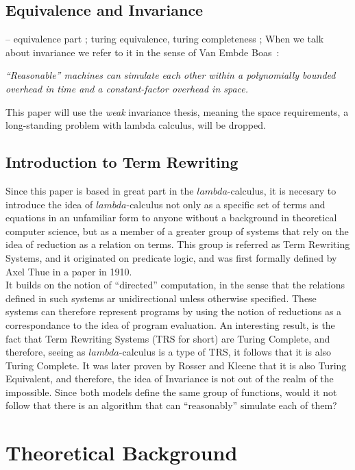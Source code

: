 \documentclass[12pt]{article}
\begin{document}
\subsection{Equivalence and Invariance}
-- equivalence part ; turing equivalence, turing completeness ;
When we talk about invariance we refer to it in the sense of Van Embde Boas~\cite{machine-models}: \\
\begin{center}
 \textit{\enquote{Reasonable} machines can simulate each other within a polynomially
bounded overhead in time and a constant-factor overhead in space.}
\end{center}

This paper will use the \textit{weak} invariance thesis, meaning the space requirements, a long-standing problem with lambda calculus, will be dropped.
\subsection{Introduction to Term Rewriting}
Since this paper is based in great part in the $lambda$-calculus, it is necesary to introduce the idea of $lambda$-calculus not only as a specific set of terms and equations in an unfamiliar form to anyone without a background in theoretical computer science, but as a member of a greater group of systems that rely on the idea of reduction as a relation on terms. This group is referred as Term Rewriting Systems, and it originated on predicate logic, and was first formally defined by Axel Thue in a paper in 1910.\\
It builds on the notion of \enquote{directed} computation, in the sense that the relations defined in such systems ar unidirectional unless otherwise specified. These systems can therefore represent programs by using the notion of reductions as a correspondance to the idea of program evaluation. An interesting result, is the fact that Term Rewriting Systems (TRS for short) are Turing Complete, and therefore, seeing as $lambda$-calculus is a type of TRS, it follows that it is also Turing Complete. It was later proven by Rosser and Kleene that it is also Turing Equivalent, and therefore, the idea of Invariance is not out of the realm of the impossible. Since both models define the same group of functions, would it not follow that there is an algorithm that can \enquote{reasonably} simulate each of them?
\section{Theoretical Background}\label{theoretical-background}
\end{document}
